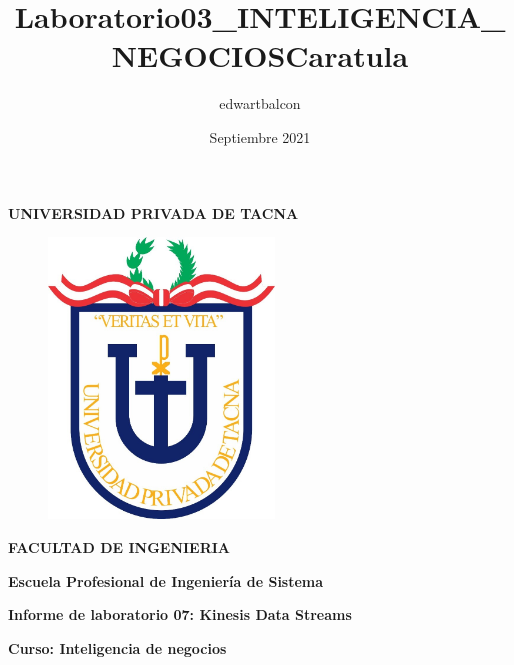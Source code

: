 \documentclass{article}
\title{Laboratorio03_INTELIGENCIA_NEGOCIOS}
\author{edwartbalcon}
\date{Septiembre 2021}
\begin{document}
\title{Caratula}

\begin{titlepage}
\begin{center}
\begin{Large}
\textbf{UNIVERSIDAD PRIVADA DE TACNA} \\
\end{Large}
\vspace*{-0.025in}
\begin{figure}[htb]
\begin{center}
\includegraphics[width=6cm]{./images/logo_UPT}
\end{center}
\end{figure}
\vspace*{-0.025in}
\begin{Large}
\textbf{FACULTAD DE INGENIERIA} \\
\end{Large}
\vspace*{0.05in}
\begin{Large}
\textbf{Escuela Profesional de Ingeniería de Sistema} \\
\end{Large}


\vspace*{0.4in}

\vspace*{0.1in}
\begin{Large}
\textbf{Informe de laboratorio 07: Kinesis Data Streams} \\
\end{Large}

\vspace*{0.3in}
\begin{Large}
\textbf{Curso: Inteligencia de negocios} \\
\end{Large}


\end{center}
\end{titlepage}
\end{document}
